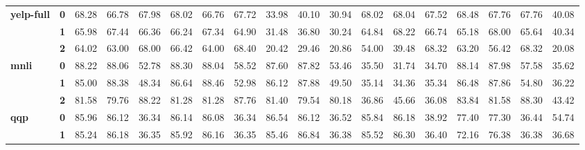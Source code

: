 \begin{sidewaystable*}[h]
\begin{tabular*}{\columnwidth}{l@{\extracolsep{\fill}}lcccccccccccccccc}
				    \hline
\multirow{3}{*}{\textbf{yelp-full}} & \textbf{0} & 68.28      & 66.78      & 67.98      & 68.02      & 66.76      & 67.72      & 33.98       & 40.10       & 30.94      & 68.02      & 68.04      & 67.52      & 68.48      & 67.76      & 67.76      & 40.08                           \\
                                    & \textbf{1} & 65.98      & 67.44      & 66.36      & 66.24      & 67.34      & 64.90      & 31.48       & 36.80       & 30.24      & 64.84      & 68.22      & 66.74      & 65.18      & 68.00      & 65.64      & 40.34                           \\
                                    & \textbf{2} & 64.02      & 63.00      & 68.00      & 66.42      & 64.00      & 68.40      & 20.42       & 29.46       & 20.86      & 54.00      & 39.48      & 68.32      & 63.20      & 56.42      & 68.32      & 20.08                           \\
				    \hline
\multirow{3}{*}{\textbf{mnli}}      & \textbf{0} & 88.22      & 88.06      & 52.78      & 88.30      & 88.04      & 58.52      & 87.60       & 87.82       & 53.46      & 35.50      & 31.74      & 34.70      & 88.14      & 87.98      & 57.58      & 35.62                           \\
                                    & \textbf{1} & 85.00      & 88.38      & 48.34      & 86.64      & 88.46      & 52.98      & 86.12       & 87.88       & 49.50      & 35.14      & 34.36      & 35.34      & 86.48      & 87.86      & 54.80      & 36.22                           \\
                                    & \textbf{2} & 81.58      & 79.76      & 88.22      & 81.28      & 81.28      & 87.76      & 81.40       & 79.54       & 80.18      & 36.86      & 45.66      & 36.08      & 83.84      & 81.58      & 88.30      & 43.42                           \\
				    \hline
\multirow{3}{*}{\textbf{qqp}}       & \textbf{0} & 85.96      & 86.12      & 36.34      & 86.14      & 86.08      & 36.34      & 86.54       & 86.12       & 36.52      & 85.84      & 86.18      & 38.92      & 77.40      & 77.30      & 36.44      & 54.74                           \\
                                    & \textbf{1} & 85.24      & 86.18      & 36.35      & 85.92      & 86.16      & 36.35      & 85.46       & 86.84       & 36.38      & 85.52      & 86.30      & 36.40      & 72.16      & 76.38      & 36.38      & 36.68                           \\

\end{tabular*}
\end{sidewaystable*}
